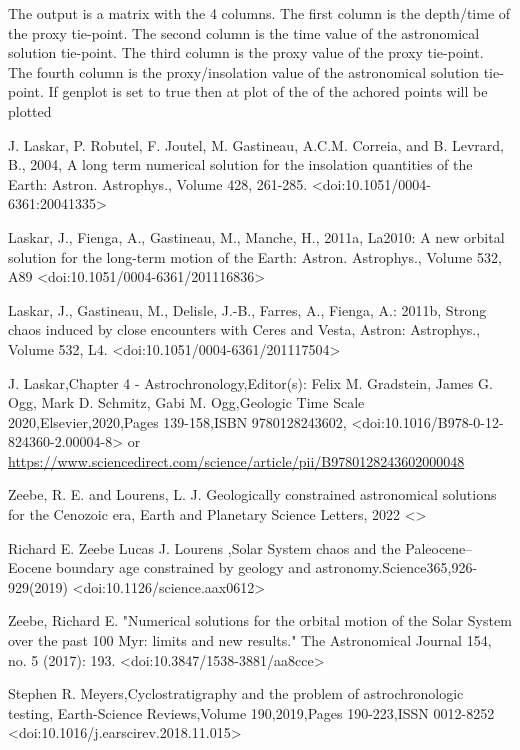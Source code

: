 \documentclass[a4paper]{book}
\begin{document}
%
\begin{Value}
The output is a matrix with the 4 columns.
The first column is the depth/time of the proxy tie-point.
The second column is the time value of the astronomical solution tie-point.
The third column is the proxy value of the proxy tie-point.
The fourth column is the proxy/insolation value of the astronomical solution  tie-point.
If genplot is set to true then at plot of the of the achored points will be plotted
\end{Value}
%
\begin{References}
J. Laskar, P. Robutel, F. Joutel, M. Gastineau, A.C.M. Correia, and B. Levrard, B., 2004,
A long term numerical solution for the insolation quantities of the Earth: Astron. Astrophys.,
Volume 428, 261-285. <doi:10.1051/0004-6361:20041335> \\{}

Laskar, J., Fienga, A., Gastineau, M., Manche, H., 2011a,
La2010: A new orbital solution for the long-term motion of the Earth: Astron. Astrophys.,
Volume 532, A89 <doi:10.1051/0004-6361/201116836> \\{}

Laskar, J., Gastineau, M., Delisle, J.-B., Farres, A., Fienga, A.:
2011b, Strong chaos induced by close encounters with Ceres and Vesta, Astron: Astrophys.,
Volume 532, L4.  <doi:10.1051/0004-6361/201117504>\\{}

J. Laskar,Chapter 4 - Astrochronology,Editor(s): Felix M. Gradstein, James G. Ogg, Mark D. Schmitz, Gabi M. Ogg,Geologic Time Scale 2020,Elsevier,2020,Pages 139-158,ISBN 9780128243602,
<doi:10.1016/B978-0-12-824360-2.00004-8> or \url{https://www.sciencedirect.com/science/article/pii/B9780128243602000048} \\{}

Zeebe, R. E. and Lourens, L. J.
Geologically constrained astronomical solutions for the Cenozoic era,
Earth and Planetary Science Letters, 2022 <>\\{}

Richard E. Zeebe Lucas J. Lourens ,Solar System chaos and the Paleocene–Eocene boundary age constrained by geology and astronomy.Science365,926-929(2019)
<doi:10.1126/science.aax0612>\\{}

Zeebe, Richard E. "Numerical solutions for the orbital motion of the Solar System over the past 100 Myr: limits and new results."
The Astronomical Journal 154, no. 5 (2017): 193. <doi:10.3847/1538-3881/aa8cce> \\{}

Stephen R. Meyers,Cyclostratigraphy and the problem of astrochronologic testing,
Earth-Science Reviews,Volume 190,2019,Pages 190-223,ISSN 0012-8252
<doi:10.1016/j.earscirev.2018.11.015>
\end{References}
\end{document}
